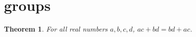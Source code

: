 \documentclass{article}
\newtheorem{theorem}{Theorem}
\begin{document}
\section{groups}

\begin{theorem}\label{thm:RG03}
For all real numbers $a,b,c,d$, $ac+bd=bd+ac$.
\end{theorem}
\end{document}
